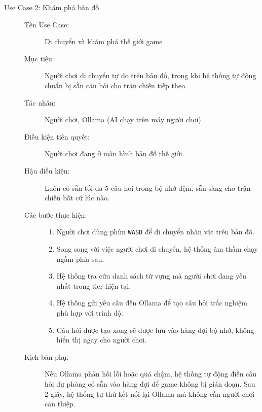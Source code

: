 \begin{description}
    \item[Use Case 2: Khám phá bản đồ] \hfill
    \begin{description}
        \item[Tên Use Case:] Di chuyển và khám phá thế giới game
        \item[Mục tiêu:] Người chơi di chuyển tự do trên bản đồ, trong khi hệ thống tự động chuẩn bị sẵn câu hỏi cho trận chiến tiếp theo.
        \item[Tác nhân:] Người chơi, Ollama (AI chạy trên máy người chơi)
        \item[Điều kiện tiên quyết:] Người chơi đang ở màn hình bản đồ thế giới.
        \item[Hậu điều kiện:] Luôn có sẵn tối đa 5 câu hỏi trong bộ nhớ đệm, sẵn sàng cho trận chiến bất cứ lúc nào.
        \item[Các bước thực hiện:] \hfill
        \begin{enumerate}
            \item Người chơi dùng phím \texttt{WASD} để di chuyển nhân vật trên bản đồ.
            \item Song song với việc người chơi di chuyển, hệ thống âm thầm chạy ngầm phía sau.
            \item Hệ thống tra cứu danh sách từ vựng mà người chơi đang yếu nhất trong tier hiện tại.
            \item Hệ thống gửi yêu cầu đến Ollama để tạo câu hỏi trắc nghiệm phù hợp với trình độ.
            \item Câu hỏi được tạo xong sẽ được lưu vào hàng đợi bộ nhớ, không hiển thị ngay cho người chơi.
        \end{enumerate}
        \item[Kịch bản phụ:] Nếu Ollama phản hồi lỗi hoặc quá chậm, hệ thống tự động điền câu hỏi dự phòng có sẵn vào hàng đợi để game không bị gián đoạn. Sau 2 giây, hệ thống tự thử kết nối lại Ollama mà không cần người chơi can thiệp.
    \end{description}

    \vspace{0.3cm}


\end{description}
